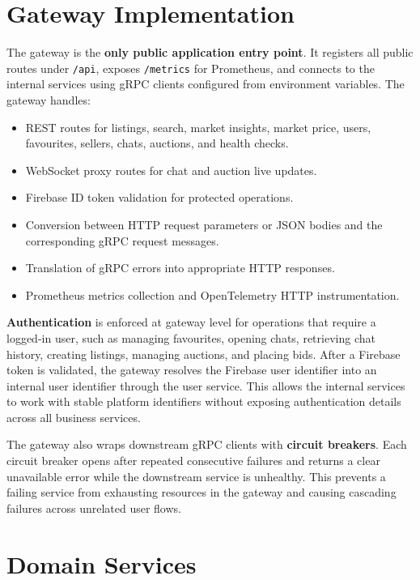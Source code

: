 \section{Gateway Implementation}

The gateway is the \textbf{only public application entry point}. It registers all public routes under \texttt{/api}, exposes \texttt{/metrics} for Prometheus, and connects to the internal services using gRPC clients configured from environment variables. The gateway handles:

\begin{itemize}
    \item REST routes for listings, search, market insights, market price, users, favourites, sellers, chats, auctions, and health checks.
    \item WebSocket proxy routes for chat and auction live updates.
    \item Firebase ID token validation for protected operations.
    \item Conversion between HTTP request parameters or JSON bodies and the corresponding gRPC request messages.
    \item Translation of gRPC errors into appropriate HTTP responses.
    \item Prometheus metrics collection and OpenTelemetry HTTP instrumentation.
\end{itemize}

\textbf{Authentication} is enforced at gateway level for operations that require a logged-in user, such as managing favourites, opening chats, retrieving chat history, creating listings, managing auctions, and placing bids. After a Firebase token is validated, the gateway resolves the Firebase user identifier into an internal user identifier through the user service. This allows the internal services to work with stable platform identifiers without exposing authentication details across all business services.

The gateway also wraps downstream gRPC clients with \textbf{circuit breakers}. Each circuit breaker opens after repeated consecutive failures and returns a clear unavailable error while the downstream service is unhealthy. This prevents a failing service from exhausting resources in the gateway and causing cascading failures across unrelated user flows.

\section{Domain Services}

